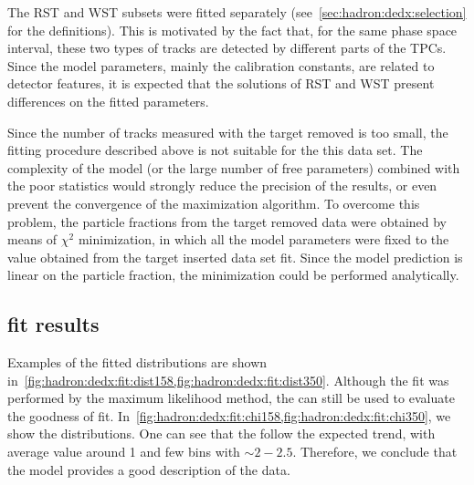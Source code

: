 The RST and WST subsets were fitted
separately (see~\cref{sec:hadron:dedx:selection} for the definitions).
This is motivated by the fact that, for the same phase space
interval, these two types of tracks are detected by
different parts of the TPCs. Since the model parameters,
mainly the calibration constants, are related to
detector features, it is expected that the solutions
of RST and WST present differences on the fitted
parameters.

Since the number of tracks measured with the target removed is
too small, the fitting procedure described above is not suitable for the
this data set. The complexity of the model
(or the large number of free parameters) combined with
the poor statistics would strongly reduce the precision of
the results, or even prevent the convergence of the maximization
algorithm. To overcome this problem, the particle fractions
from the target removed data were obtained by means of
$\chi^2$ minimization, in which all the model parameters
were fixed to the value obtained from the target inserted
data set fit. Since the model prediction is linear on
the particle fraction, the minimization could be performed
analytically. 

\subsection[\dedx fit results]{\boldmath \dedx fit results}
\label{sec:hadron:dedx:fitresults}

Examples of the fitted \dedx distributions are shown
in~\cref{fig:hadron:dedx:fit:dist158,fig:hadron:dedx:fit:dist350}.
Although the fit was performed by the maximum likelihood method,
the \redchisq can still be used to evaluate the goodness of fit.
In~\cref{fig:hadron:dedx:fit:chi158,fig:hadron:dedx:fit:chi350},
we show the \redchisq distributions.
One can see that the \redchisq follow the expected trend,
with average value around 1 and few bins with \redchisq$\sim2-2.5$.
Therefore, we conclude that the \dedx model
provides a good description of the data.

